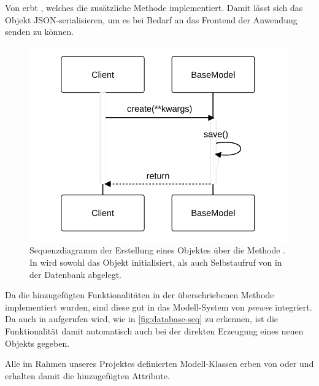 Von  erbt , welches die zusätzliche Methode  implementiert. Damit lässt sich das Objekt JSON-serialisieren, um es bei Bedarf an das Frontend der Anwendung senden zu können.

\begin{figure}[!ht]
	\centering
	\includegraphics[width=0.55\linewidth]{images/diagrams/database-seq.pdf}
	\caption{Sequenzdiagramm der Erstellung eines Objektes über die Methode . In  wird sowohl das Objekt initialisiert, als auch Selbstaufruf von  in der Datenbank abgelegt.}
	\label{fig:database-seq}
\end{figure}

Da die hinzugefügten Funktionalitäten in der überschriebenen Methode  implementiert wurden, sind diese gut in das Modell-System von \emph{peewee} integriert. Da  auch in  aufgerufen wird, wie in \autoref{fig:database-seq} zu erkennen, ist die Funktionalität damit automatisch auch bei der direkten Erzeugung eines neuen Objekts gegeben.

Alle im Rahmen unseres Projektes definierten Modell-Klassen erben von  oder  und erhalten damit die hinzugefügten Attribute.